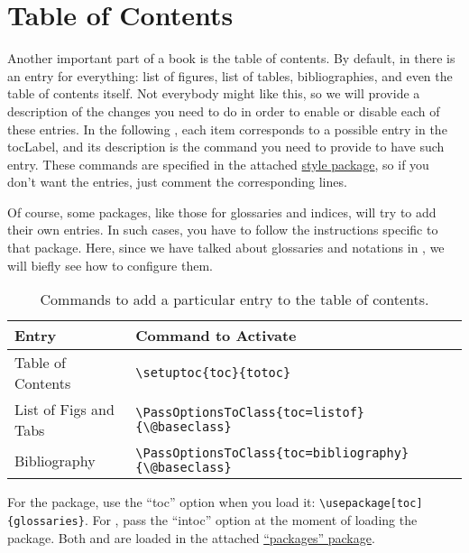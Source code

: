\section{Table of Contents}

Another important part of a book is the table of contents. By default, 
in  there is an entry for everything: list of figures, 
list of tables, bibliographies, and even the table of contents itself. 
Not everybody might like this, so we will provide a description of the 
changes you need to do in order to enable or disable each of these 
entries. In the following , each item corresponds to 
a possible entry in the \acrshort{tocLabel}, and its description is the 
command you need to provide to have such entry. These commands are 
specified in the attached \href{style/style.sty}{style 
package}, so if you don't want the entries, just comment the 
corresponding lines.

Of course, some packages, like those for glossaries and indices, will 
try to add their own entries. In such cases, you have to follow the 
instructions specific to that package. Here, since we have talked about 
glossaries and notations in , we will biefly see how 
to configure them.

\begin{table}
\footnotesize
\caption{Commands to add a particular entry to the table of contents.}
\begin{tabular}{ l l }
	\toprule
	Entry & Command to Activate \\
	\midrule
	Table of Contents & \lstinline|\setuptoc{toc}{totoc}| \\
	List of Figs and Tabs & \lstinline|\PassOptionsToClass{toc=listof}{\@baseclass}| \\
	Bibliography & \lstinline|\PassOptionsToClass{toc=bibliography}{\@baseclass}| \\
	\bottomrule
\end{tabular}
\end{table}

For the  package, use the \enquote{toc} option when 
you load it: \lstinline|\usepackage[toc]{glossaries}|. For 
, pass the \enquote{intoc} option at the moment of 
loading the package. Both  and  are 
loaded in the attached \href{style/packages.sty}{\enquote{packages} 
package}.

